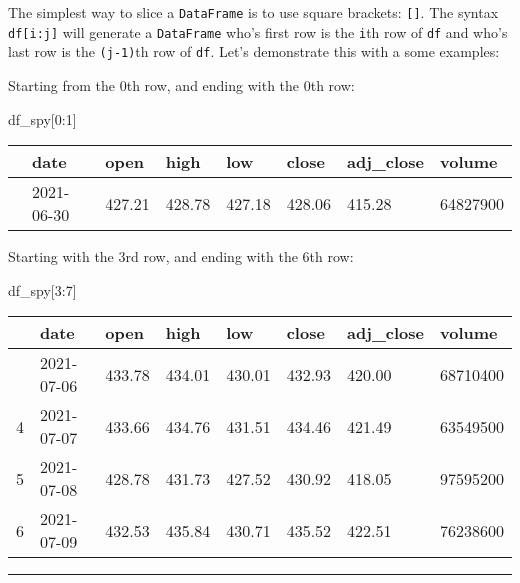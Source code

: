 \documentclass[
  letterpaper,
  DIV=11,
  numbers=noendperiod]{scrreprt}
\newenvironment{Shaded}{\begin{snugshade}}{\end{snugshade}}
\newcommand{\DecValTok}[1]{\textcolor[rgb]{0.68,0.00,0.00}{#1}}
\newcommand{\NormalTok}[1]{\textcolor[rgb]{0.00,0.23,0.31}{#1}}
\begin{document}
The simplest way to slice a \texttt{DataFrame} is to use square
brackets: \texttt{{[}{]}}. The syntax \texttt{df{[}i:j{]}} will generate
a \texttt{DataFrame} who's first row is the \texttt{i}th row of
\texttt{df} and who's last row is the \texttt{(j-1)}th row of
\texttt{df}. Let's demonstrate this with a some examples:

Starting from the 0th row, and ending with the 0th row:

\begin{Shaded}
\begin{Highlighting}[]
\NormalTok{df\_spy[}\DecValTok{0}\NormalTok{:}\DecValTok{1}\NormalTok{]}
\end{Highlighting}
\end{Shaded}

\begin{longtable}[]{@{}llllllll@{}}
\toprule\noalign{}
& date & open & high & low & close & adj\_close & volume \\
\midrule\noalign{}
\endhead
\bottomrule\noalign{}
\endlastfoot
0 & 2021-06-30 & 427.21 & 428.78 & 427.18 & 428.06 & 415.28 &
64827900 \\
\end{longtable}

Starting with the 3rd row, and ending with the 6th row:

\begin{Shaded}
\begin{Highlighting}[]
\NormalTok{df\_spy[}\DecValTok{3}\NormalTok{:}\DecValTok{7}\NormalTok{]}
\end{Highlighting}
\end{Shaded}

\begin{longtable}[]{@{}llllllll@{}}
\toprule\noalign{}
& date & open & high & low & close & adj\_close & volume \\
\midrule\noalign{}
\endhead
\bottomrule\noalign{}
\endlastfoot
3 & 2021-07-06 & 433.78 & 434.01 & 430.01 & 432.93 & 420.00 &
68710400 \\
4 & 2021-07-07 & 433.66 & 434.76 & 431.51 & 434.46 & 421.49 &
63549500 \\
5 & 2021-07-08 & 428.78 & 431.73 & 427.52 & 430.92 & 418.05 &
97595200 \\
6 & 2021-07-09 & 432.53 & 435.84 & 430.71 & 435.52 & 422.51 &
76238600 \\
\end{longtable}

\begin{center}\rule{0.5\linewidth}{0.5pt}\end{center}
\end{document}
